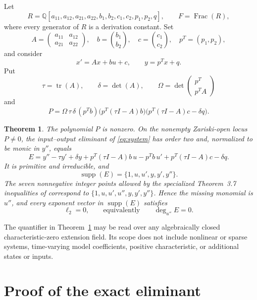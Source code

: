 \documentclass[11pt]{article}
\newtheorem{theorem}{Theorem}
\newcommand{\supp}{\operatorname{supp}}
\newcommand{\Frac}{\operatorname{Frac}}
\begin{document}
Let
\[
 R=\mathbb{Q}[a_{11},a_{12},a_{21},a_{22},b_1,b_2,c_1,c_2,p_1,p_2,q],
 \qquad F=\Frac(R),
\]
where every generator of \(R\) is a derivation constant.  Set
\[
 A=\begin{pmatrix}a_{11}&a_{12}\\a_{21}&a_{22}\end{pmatrix},\quad
 b=\binom{b_1}{b_2},\quad c=\binom{c_1}{c_2},\quad
 p^T=(p_1,p_2),
\]
and consider
\begin{equation}\label{eq:system}
 x'=Ax+bu+c,\qquad y=p^Tx+q.
\end{equation}
Put
\[
 \tau=\operatorname{tr}(A),\qquad \delta=\det(A),\qquad
 \Omega=\det\!\begin{pmatrix}p^T\\p^TA\end{pmatrix}
\]
and
\begin{equation}\label{eq:P}
 P=\Omega\,\tau\,\delta\,(p^Tb)
 \bigl(p^T(\tau I-A)b\bigr)
 \bigl(p^T(\tau I-A)c-\delta q\bigr).
\end{equation}

\begin{theorem}\label{thm:main}
The polynomial \(P\) is nonzero.  On the nonempty Zariski-open locus
\(P\ne0\), the input--output eliminant of \eqref{eq:system} has order two
and, normalized to be monic in \(y''\), equals
\begin{equation}\label{eq:E}
 E=y''-\tau y'+\delta y
   +p^T(\tau I-A)b\,u-p^Tb\,u'
   +p^T(\tau I-A)c-\delta q.
\end{equation}
It is primitive and irreducible, and
\[
 \supp(E)=\{1,u,u',y,y',y''\}.
\]
The seven nonnegative integer points allowed by the specialized
Theorem~3.7 inequalities of \cite{JeronimoLanciano2026} correspond to
\(\{1,u,u',u'',y,y',y''\}\).  Hence the missing monomial is \(u''\), and
every exponent vector in \(\supp(E)\) satisfies
\[
 \ell_2=0,
 \qquad\text{equivalently}\qquad \deg_{u''}E=0.
\]
\end{theorem}

The quantifier in Theorem~\ref{thm:main} may be read over any algebraically
closed characteristic-zero extension field.  Its scope does not include
nonlinear or sparse systems, time-varying model coefficients, positive
characteristic, or additional states or inputs.

\section{Proof of the exact eliminant}
\end{document}

